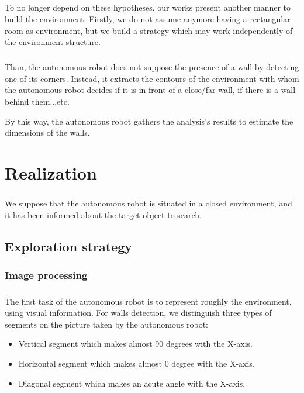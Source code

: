 \documentclass[12pt]{report}
\begin{document}
	\paragraph{}
	To no longer depend on these hypotheses, our works present another manner to build the environment. Firstly, we do not assume anymore having a rectangular room as environment, but we build a strategy which may work independently of the environment structure. 
	\paragraph{}
	Than, the autonomous robot does not suppose the presence of a wall by detecting one of its corners. Instead, it extracts the contours of the environment with whom the autonomous robot decides if it is in front of a close/far wall, if there is a wall behind them...etc.
	
	By this way, the autonomous robot gathers the analysis's results to estimate the dimensions of the walls.
	
    \chapter{Realization}
    \paragraph{}
    We suppose that the autonomous robot is situated in a closed environment, and it has been informed about the target object to search. 
	\section{Exploration strategy}
	 \subsection{Image processing}
	 \paragraph{}
	 The first task of the autonomous robot is to represent roughly the environment, using visual information. For walls detection, we distinguish three types of segments on the picture taken by the autonomous robot:
	 \begin{itemize}
	 	\item Vertical segment which makes almost 90 degrees with the X-axis.
	 	\item Horizontal segment which makes almost 0 degree with the  X-axis.
	 	\item Diagonal segment which makes an acute angle with the X-axis.
	 \end{itemize} 
	 
\end{document}
